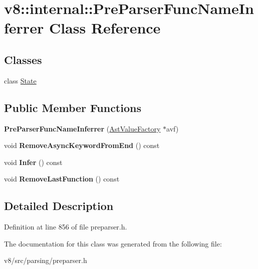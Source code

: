 \hypertarget{classv8_1_1internal_1_1PreParserFuncNameInferrer}{}\section{v8\+:\+:internal\+:\+:Pre\+Parser\+Func\+Name\+Inferrer Class Reference}
\label{classv8_1_1internal_1_1PreParserFuncNameInferrer}
\subsection*{Classes}
\begin{DoxyCompactItemize}
\item 
class \mbox{\hyperlink{classv8_1_1internal_1_1PreParserFuncNameInferrer_1_1State}{State}}
\end{DoxyCompactItemize}
\subsection*{Public Member Functions}
\begin{DoxyCompactItemize}
\item 
\mbox{\label{classv8_1_1internal_1_1PreParserFuncNameInferrer_a0ff0c9f06b7521f2fa0e13b3a0af653b}} 
{\bfseries Pre\+Parser\+Func\+Name\+Inferrer} (\mbox{\hyperlink{classv8_1_1internal_1_1AstValueFactory}{Ast\+Value\+Factory}} $\ast$avf)
\item 
\mbox{\label{classv8_1_1internal_1_1PreParserFuncNameInferrer_a42eaa066d36da9e09cea79cc353957ce}} 
void {\bfseries Remove\+Async\+Keyword\+From\+End} () const
\item 
\mbox{\label{classv8_1_1internal_1_1PreParserFuncNameInferrer_a8e572a34116c3dca88ec85a20f1df3da}} 
void {\bfseries Infer} () const
\item 
\mbox{\label{classv8_1_1internal_1_1PreParserFuncNameInferrer_a5a6f647dd1d28945377da58a4a12f197}} 
void {\bfseries Remove\+Last\+Function} () const
\end{DoxyCompactItemize}


\subsection{Detailed Description}


Definition at line 856 of file preparser.\+h.



The documentation for this class was generated from the following file\+:\begin{DoxyCompactItemize}
\item 
v8/src/parsing/preparser.\+h\end{DoxyCompactItemize}
